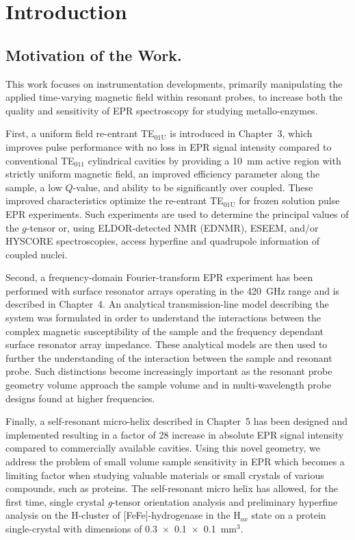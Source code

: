 \chapter[Introduction]{Introduction}





\section{Motivation of the Work.}
This work focuses on instrumentation developments, primarily manipulating the applied time-varying magnetic field within resonant probes, to increase both the quality and sensitivity of EPR spectroscopy for studying metallo-enzymes. 

First, a uniform field re-entrant TE$_{\text{01U}}$ is introduced in Chapter~3, which improves pulse performance with no loss in EPR signal intensity compared to conventional TE$_{011}$ cylindrical cavities by providing a 10~mm active region with strictly uniform magnetic field, an improved efficiency parameter along the sample, a low $Q$-value, and ability to be significantly over coupled. These improved characteristics optimize the re-entrant TE$_{\text{01U}}$ for frozen solution pulse EPR experiments. Such experiments are used to determine the principal values of the $g$-tensor or, using ELDOR-detected NMR (EDNMR), ESEEM, and/or HYSCORE spectroscopies, access hyperfine and quadrupole information of coupled nuclei. 

Second, a frequency-domain Fourier-transform EPR experiment has been performed with surface resonator arrays operating in the 420~GHz range and is described in Chapter~4. An analytical transmission-line model describing the system was formulated in order to understand the interactions between the complex magnetic susceptibility of the sample and the frequency dependant surface resonator array impedance. These analytical models are then used to further the understanding of the interaction between the sample and resonant probe. Such distinctions become increasingly important as the resonant probe geometry volume approach the sample volume and in multi-wavelength probe designs found at higher frequencies. 

Finally, a self-resonant micro-helix  described in Chapter~5 has been designed and implemented resulting in a factor of 28 increase in absolute EPR signal intensity compared to commercially available cavities. Using this novel geometry, we address the problem of small volume sample sensitivity in EPR which becomes a limiting factor when studying valuable materials or small crystals of various compounds, such as proteins. The self-resonant micro helix has allowed, for the first time, single crystal \textit{g}-tensor orientation analysis and preliminary hyperfine analysis on the H-cluster of [FeFe]-hydrogenase in the H$_{ox}$ state on a protein single-crystal with dimensions of 0.3~$\times$~0.1~$\times$~0.1~mm$^3$. 

